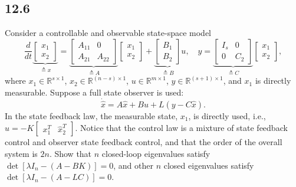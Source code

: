 \documentclass{article}
\newcommand{\problem}[2]{\subsection*{#1}}
\begin{document}
\problem{12.6}{}
Consider a controllable and observable state-space model
\[
\frac{d}{dt}\underbrace{\begin{bmatrix} x_1 \\ x_2 \end{bmatrix}}_{\triangleq x} =
\underbrace{\begin{bmatrix} A_{11} & 0 \\ A_{21} & A_{22} \end{bmatrix}}_{\triangleq A}
\begin{bmatrix} x_1 \\ x_2 \end{bmatrix} +
\underbrace{\begin{bmatrix} B_1 \\ B_2 \end{bmatrix}}_{\triangleq B} u, \quad
y = \underbrace{\begin{bmatrix} I_s & 0 \\ 0 & C_2 \end{bmatrix}}_{\triangleq C}
\begin{bmatrix} x_1 \\ x_2 \end{bmatrix},
\]
where $x_1 \in \mathbb{R}^{s \times 1}$, $x_2 \in \mathbb{R}^{(n-s) \times 1}$, $u \in \mathbb{R}^{m \times 1}$, $y \in \mathbb{R}^{(s+1) \times 1}$, and $x_1$ is directly measurable. Suppose a full state observer is used:
\[
\dot{\widehat{x}} = A\widehat{x} + Bu + L\left(y - C\widehat{x}\right).
\]
In the state feedback law, the measurable state, $x_1$, is directly used, i.e., $u = -K\begin{bmatrix} x_1^T & \widehat{x}_2^T \end{bmatrix}$. Notice that the control law is a mixture of state feedback control and observer state feedback control, and that the order of the overall system is $2n$. Show that $n$ closed-loop eigenvalues satisfy $\det[\lambda I_n - (A - BK)] = 0$, and other $n$ closed eigenvalues satisfy $\det[\lambda I_n - (A - LC)] = 0$.
\end{document}

